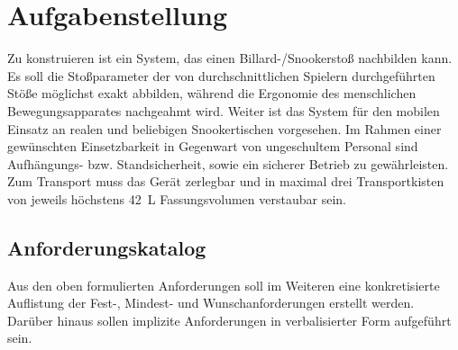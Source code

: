 \chapter{Aufgabenstellung}\label{chap:Aufgabenstellung}

	Zu konstruieren ist ein System, das einen Billard-/Snookerstoß nachbilden kann.
	Es soll die Stoßparameter der von durchschnittlichen Spielern durchgeführten Stöße möglichst exakt abbilden, während die Ergonomie des menschlichen Bewegungsapparates nachgeahmt wird.
	Weiter ist das System für den mobilen Einsatz an realen und beliebigen Snookertischen vorgesehen. Im Rahmen einer gewünschten Einsetzbarkeit in Gegenwart von ungeschultem Personal sind Aufhängungs- bzw. Standsicherheit, sowie ein sicherer Betrieb zu gewährleisten.
	Zum Transport muss das Gerät zerlegbar und in maximal drei Transportkisten von jeweils höchstens \SI{42}{L} Fassungsvolumen verstaubar sein.

	\section{Anforderungskatalog}
		Aus den oben formulierten Anforderungen soll im Weiteren eine konkretisierte Auflistung der Fest-, Mindest- und Wunschanforderungen erstellt werden.
		Darüber hinaus sollen implizite Anforderungen in verbalisierter Form aufgeführt sein.\par\medskip


